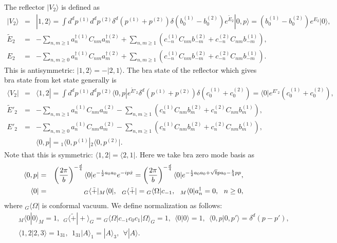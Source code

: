 \documentclass[12pt,a4paper]{article}
\begin{document}
The reflector $|V_2\rangle$ is defined as
\begin{eqnarray}
\label{eqn:RFK}
|V_2\rangle&=&|1,2\rangle=\int d^dp^{(1)}d^dp^{(2)}\delta^d(p^{(1)}+p^{(2)})\delta(b^{(1)}_0-b^{(2)}_0)e^{{\tilde E}_2}|0,p\rangle=(b^{(1)}_0-b^{(2)}_0)e^{E_2}|0\rangle, \nonumber \\
{\tilde E}_2&=&-\sum_{n,m\geq1}a^{\dagger(1)}_nC_{nm}a^{\dagger(2)}_m+\sum_{n,m\geq1}(c^{(1)}_{-n}C_{nm}b^{(2)}_{-m}+c^{(2)}_{-n}C_{nm}b^{(1)}_{-m}), \nonumber \\
E_2&=&-\sum_{n,m\geq0}a^{\dagger(1)}_nC_{nm}a^{\dagger(2)}_m+\sum_{n,m\geq1}(c^{(1)}_{-n}C_{nm}b^{(2)}_{-m}+c^{(2)}_{-n}C_{nm}b^{(1)}_{-m}).
\end{eqnarray}
This is antisymmetric: $|1,2\rangle=-|2,1\rangle$.
The bra state of the reflector which gives bra state from ket state generally is
\begin{eqnarray}
\label{eqn:RFB}
\langle V_2|&=&\langle1,2|=\int d^dp^{(1)}d^dp^{(2)}\langle0,p|e^{{\tilde E}'_2}\delta^d(p^{(1)}+p^{(2)})\delta(c^{(1)}_0+c^{(2)}_0)=\langle0|e^{E'_2}(c^{(1)}_0+c^{(2)}_0),\nonumber \\
{\tilde E}'_2&=&-\sum_{n,m\geq1}a^{(1)}_nC_{nm}a^{(2)}_m-\sum_{n,m\geq1}(c^{(1)}_nC_{nm}b^{(2)}_m+c^{(2)}_nC_{nm}b^{(1)}_m), \nonumber \\
E'_2&=&-\sum_{n,m\geq0}a^{(1)}_nC_{nm}a^{(2)}_m-\sum_{n,m\geq1}(c^{(1)}_nC_{nm}b^{(2)}_m+c^{(2)}_nC_{nm}b^{(1)}_m),\nonumber \\
&&\langle0,p|={}_1\langle0,p^{(1)}| {}_2\langle0,p^{(2)}|.
\end{eqnarray}
Note that this is symmetric: $\langle1,2|=\langle2,1|$.
Here we take bra zero mode basis as
\begin{eqnarray}
\langle0,p|&=&\left({2\pi\over b}\right)^{-{d\over4}}\langle0|e^{-{1\over2}a_0a_0}e^{-ip{\hat x}}
=\left({2\pi\over b}\right)^{-{d\over4}}\langle0|e^{-{1\over2}a_0a_0+\sqrt b p a_0-{b\over4}pp},\nonumber \\
\langle0|&=& {}_G\langle{\tilde +}| {}_M\langle0|,\ \ {}_G\langle{\tilde +}|= {}_G\langle\Omega|c_{-1},\ \  {}_M\langle0|a^\dagger_n=0,\ \ n\geq0,
\end{eqnarray}
where ${}_G\langle\Omega|$ is conformal vacuum.
We define normalization as follows:
\begin{eqnarray}
&& {}_M\langle0|0\rangle_M=1,\ \ {}_G\langle{\tilde +}|+\rangle_G= {}_G\langle\Omega|c_{-1}c_0c_1|\Omega\rangle_G=1,\ \ \langle0|0\rangle=1,\ \ \langle0,p|0,p'\rangle=\delta^d(p-p'),\nonumber \\
&&\langle1,2|2,3\rangle=1_{31},\ \ 1_{31}|A\rangle_1=|A\rangle_3 ,\ \ \forall|A\rangle.
\end{eqnarray}
\end{document}
